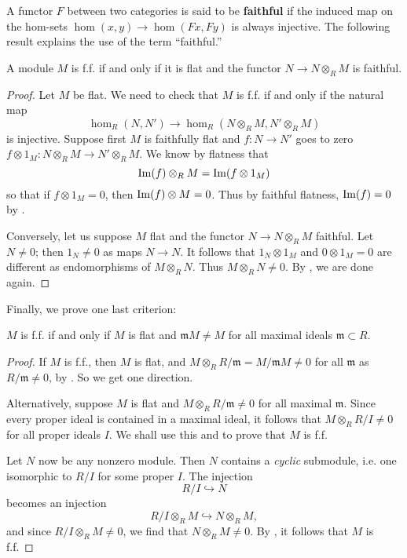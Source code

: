 A functor $F$ between two categories is said to be \textbf{faithful} if the
induced map on the hom-sets $\hom(x,y) \to \hom(Fx, Fy)$ is always injective.
The following result explains the use of the term ``faithful.''

\begin{proposition} 
A module $M$ is f.f. if and only if it is flat and the functor $N \to N
\otimes_R M$ is faithful.
\end{proposition} 
\begin{proof} Let $M$ be flat.
We need to check that $M$ is f.f. if and only if the natural map
\[ \hom_R(N, N') \to \hom_R(N \otimes_R M, N' \otimes_R M)  \]
is injective.
Suppose first $M$ is faithfully flat and $f: N \to N'$ goes to zero $f \otimes
1_M: N \otimes_R M \to  N' \otimes_R M$. We know by flatness that
\[ \operatorname{Im}(f) \otimes_R M = \operatorname{Im}(f \otimes 1_M)  \]
so that if $f \otimes 1_M = 0$, then $\operatorname{Im}(f) \otimes M = 0$. Thus by faithful
flatness, $\operatorname{Im}(f) = 0$ by .

Conversely, let us suppose $M$ flat and the functor $N \to N \otimes_R M$
faithful. Let $N \neq 0$; then $1_N \neq 0$ as maps $N \to N$. 
It follows that $1_N \otimes 1_M$ and $0 \otimes 1_M = 0$ are different as
endomorphisms of $M \otimes_R N$. Thus $M \otimes_R N \neq 0$. By
, we are done again.
\end{proof} 


Finally, we prove one last criterion:

\begin{proposition} \label{ffmaximal} 
$M$ is f.f. if and only if $M$ is flat and $\mathfrak{m}M \neq M$ for all
maximal ideals $\mathfrak{m} \subset R$.
\end{proposition} 
\begin{proof} 
If $M$ is f.f., then $M$ is flat, and $M \otimes_R R/\mathfrak{m} =
M/\mathfrak{m}M \neq 0$ for all $\mathfrak{m}$ as $R/\mathfrak{m} \neq 0$, by
. So we get one direction.

Alternatively, suppose $M$ is flat and $M \otimes_R R/\mathfrak{m} \neq 0$ for
all maximal $\mathfrak{m}$. Since every proper ideal is contained in a maximal
ideal, it follows that $M \otimes_R R/I \neq 0$ for all proper ideals $I$. We
shall use this and  to prove that $M$ is f.f.

Let $N$ now be any nonzero module. Then $N$ contains a \emph{cyclic} submodule, i.e.
one isomorphic to $R/I$ for some proper $I$. The injection
\[ R/I \hookrightarrow N  \]
becomes an injection
\[ R/I \otimes_R M \hookrightarrow N \otimes_R M,  \]
and since $R/I \otimes_R M \neq 0$, we find that $N \otimes_R M \neq 0$. By
, it follows that $M$ is f.f.
\end{proof} 

